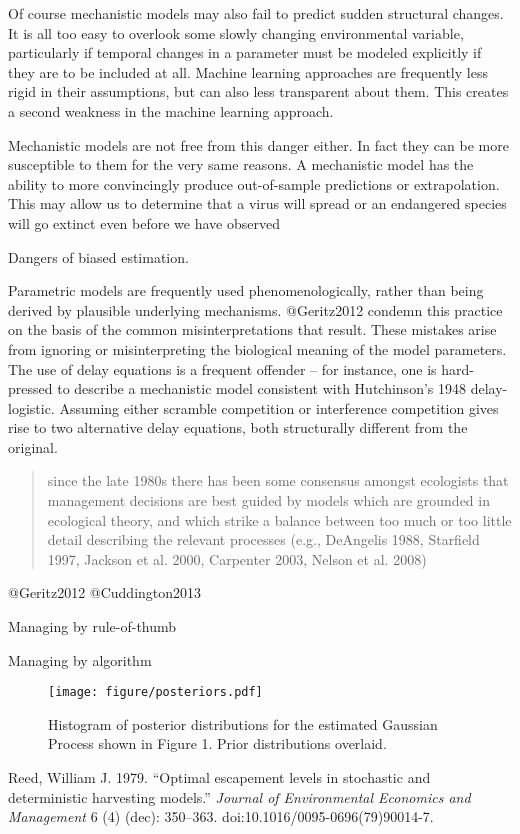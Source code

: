 \documentclass[author-year, review]{elsarticle} %
\makeatletter
\def\maxwidth{\ifdim\Gin@nat@width>\linewidth\linewidth
\else\Gin@nat@width\fi}
\let\Oldincludegraphics\includegraphics
\renewcommand{\includegraphics}[1]{\Oldincludegraphics[width=\maxwidth]{#1}}
\makeatother
\begin{document}
Of course mechanistic models may also fail to predict sudden structural
changes. It is all too easy to overlook some slowly changing
environmental variable, particularly if temporal changes in a parameter
must be modeled explicitly if they are to be included at all. Machine
learning approaches are frequently less rigid in their assumptions, but
can also less transparent about them. This creates a second weakness in
the machine learning approach.

Mechanistic models are not free from this danger either. In fact they
can be more susceptible to them for the very same reasons. A mechanistic
model has the ability to more convincingly produce out-of-sample
predictions or extrapolation. This may allow us to determine that a
virus will spread or an endangered species will go extinct even before
we have observed

Dangers of biased estimation.

Parametric models are frequently used phenomenologically, rather than
being derived by plausible underlying mechanisms. @Geritz2012 condemn
this practice on the basis of the common misinterpretations that result.
These mistakes arise from ignoring or misinterpreting the biological
meaning of the model parameters. The use of delay equations is a
frequent offender -- for instance, one is hard-pressed to describe a
mechanistic model consistent with Hutchinson's 1948 delay-logistic.
Assuming either scramble competition or interference competition gives
rise to two alternative delay equations, both structurally different
from the original.

\begin{quote}
since the late 1980s there has been some consensus amongst ecologists
that management decisions are best guided by models which are grounded
in ecological theory, and which strike a balance between too much or too
little detail describing the relevant processes (e.g., DeAngelis 1988,
Starfield 1997, Jackson et al. 2000, Carpenter 2003, Nelson et al. 2008)
\end{quote}

@Geritz2012 @Cuddington2013

Managing by rule-of-thumb

Managing by algorithm

\begin{figure}[htbp]
\centering
\texttt{[image: figure/posteriors.pdf]}
\caption{Histogram of posterior distributions for the estimated Gaussian
Process shown in Figure 1. Prior distributions overlaid.}
\end{figure}

Reed, William J. 1979. ``Optimal escapement levels in stochastic and
deterministic harvesting models.'' \emph{Journal of Environmental
Economics and Management} 6 (4) (dec): 350--363.
doi:10.1016/0095-0696(79)90014-7.
\end{document}

